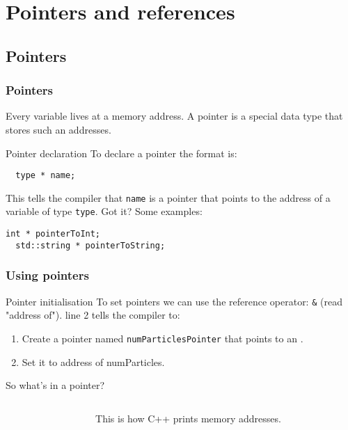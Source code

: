 \documentclass{beamer}
\begin{document}
\section{Pointers and references}

\subsection{Pointers}

\begin{frame}[fragile]
  \frametitle{Pointers}
  Every variable lives at a memory address.  A pointer is a special data type that stores such an addresses.
  \begin{block}{Pointer declaration}
  To declare a pointer the format is:
	  \begin{lstlisting}
  type * name;
	  \end{lstlisting}
	  This tells the compiler that \texttt{name} is a pointer that points to the address of a variable of type \texttt{type}.  Got it?
	  \newline
	  Some examples:
	  \begin{lstlisting}[belowskip=0pt]
  int * pointerToInt;
  std::string * pointerToString;
	  \end{lstlisting}
  \end{block}
\end{frame}


\begin{frame}[fragile]
  \frametitle{Using pointers}
  \begin{block}{Pointer initialisation}
	  To set pointers we can use the reference operator: \texttt{\&} (read "address of").
	  line 2 tells the compiler to:
	  \begin{enumerate}
	    \pause
	    \item{Create a pointer named \texttt{numParticlesPointer} that points to an .}
	    \pause
	    \item{Set it to address of numParticles.}
	  \end{enumerate}
  \end{block}
  \pause
  \begin{block}{So what's in a pointer?}
	  \begin{columns}[t]
	    \begin{column}[T]{0.5\textwidth}
			  
			\end{column}\pause
			\begin{column}[T]{0.5\textwidth}
			  \newline
			  This is how C++ prints memory addresses.
	    \end{column}
	  \end{columns}
  \end{block}
\end{frame}
\end{document}

